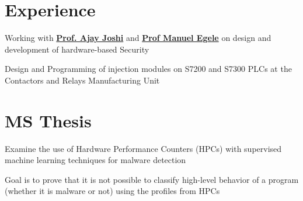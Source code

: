 \documentclass[]{deedy_format_Anmol}
\begin{document}
\hfill
\begin{minipage}[t]{0.66\textwidth} 
%
%



\section{Experience}
\vspace{0.5mm} %
\vspace{\topsep} %
\vspace{1mm}
\justify
\begin{tightemize}
\item Working with \textbf{\href{https://www.bu.edu/eng/profile/ajay-joshi/}{Prof. Ajay Joshi}} and \textbf{\href{https://www.bu.edu/eng/profile/manuel-egele/}{Prof Manuel Egele}} on design and development of hardware-based Security
\end{tightemize}
\vspace{\topsep}
\sectionsep

\vspace{1mm}
\justify
\begin{tightemize}
\item Design and Programming of injection modules on S7200 and S7300 PLCs at the Contactors and Relays Manufacturing Unit
\end{tightemize}
\vspace{\topsep}
\sectionsep


\section{MS Thesis}
\vspace{0.5mm} %
\vspace{1mm}
\justify
\begin{tightemize}
\item Examine the use of Hardware Performance Counters (HPCs) with supervised machine learning techniques for malware detection 
\item Goal is to prove that it is not possible to classify high-level behavior of a program (whether it is malware or not) using the profiles from HPCs
\end{tightemize}
\vspace{\topsep}
\sectionsep



\end{minipage}
\end{document}

